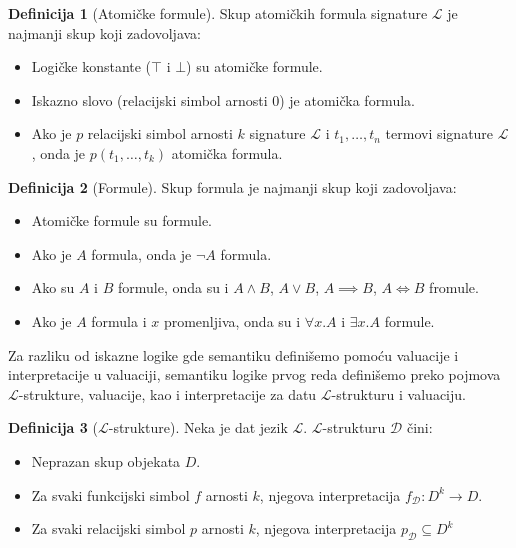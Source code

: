 \documentclass[a4paper,10pt]{article}
\theoremstyle{definition}
\newtheorem{definition}{Definicija}[section]
\begin{document}
\begin{definition}[Atomičke formule]
    Skup atomičkih formula signature $\mathcal{L}$ je najmanji skup koji zadovoljava:
    \begin{itemize}
        \item{Logičke konstante ($\top$ i $\bot$) su atomičke formule.}
        \item{Iskazno slovo (relacijski simbol arnosti $0$) je atomička formula.}
        \item{Ako je $p$ relacijski simbol arnosti $k$ signature $\mathcal{L}$ i $t_1, \ldots, t_n$ termovi signature $\mathcal{L}$, onda je $p(t_1, \ldots, t_k)$ atomička formula.}
    \end{itemize}
\end{definition}

\begin{definition}[Formule]
    Skup formula je najmanji skup koji zadovoljava:
    \begin{itemize}
        \item{Atomičke formule su formule.}
        \item{Ako je $A$ formula, onda je $\neg A$ formula.}
        \item{Ako su $A$ i $B$ formule, onda su i $A \land B$, $A \lor B$, $A \implies B$, $A \iff B$ fromule.}
        \item{Ako je $A$ formula i $x$ promenljiva, onda su i $\forall x. A$ i $\exists x. A$ formule.}
    \end{itemize}
\end{definition}

Za razliku od iskazne logike gde semantiku definišemo pomoću valuacije i interpretacije u valuaciji, semantiku logike prvog reda definišemo preko pojmova $\mathcal{L}$-strukture, valuacije, kao i interpretacije za datu $\mathcal{L}$-strukturu i valuaciju.

\begin{definition}[$\mathcal{L}$-strukture]
    Neka je dat jezik $\mathcal{L}$. $\mathcal{L}$-strukturu $\mathcal{D}$ čini:
    \begin{itemize}
        \item{Neprazan skup objekata $D$.}
        \item{Za svaki funkcijski simbol $f$ arnosti $k$, njegova interpretacija $f_\mathcal{D} : D^k \to D$.}
        \item{Za svaki relacijski simbol $p$ arnosti $k$, njegova interpretacija $p_\mathcal{D} \subseteq D^k$}
    \end{itemize}
\end{definition}
\end{document}
